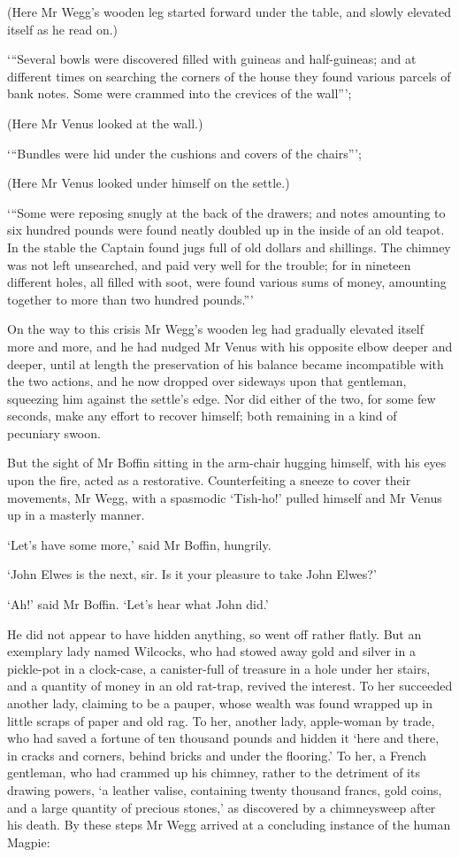 (Here Mr Wegg’s wooden leg started forward under the table, and slowly
elevated itself as he read on.)

‘“Several bowls were discovered filled with guineas and half-guineas;
and at different times on searching the corners of the house they found
various parcels of bank notes. Some were crammed into the crevices of
the wall”’;

(Here Mr Venus looked at the wall.)

‘“Bundles were hid under the cushions and covers of the chairs”’;

(Here Mr Venus looked under himself on the settle.)

‘“Some were reposing snugly at the back of the drawers; and notes
amounting to six hundred pounds were found neatly doubled up in the
inside of an old teapot. In the stable the Captain found jugs full of
old dollars and shillings. The chimney was not left unsearched, and paid
very well for the trouble; for in nineteen different holes, all filled
with soot, were found various sums of money, amounting together to more
than two hundred pounds.”’

On the way to this crisis Mr Wegg’s wooden leg had gradually elevated
itself more and more, and he had nudged Mr Venus with his opposite
elbow deeper and deeper, until at length the preservation of his balance
became incompatible with the two actions, and he now dropped over
sideways upon that gentleman, squeezing him against the settle’s edge.
Nor did either of the two, for some few seconds, make any effort to
recover himself; both remaining in a kind of pecuniary swoon.

But the sight of Mr Boffin sitting in the arm-chair hugging himself,
with his eyes upon the fire, acted as a restorative. Counterfeiting a
sneeze to cover their movements, Mr Wegg, with a spasmodic ‘Tish-ho!’
pulled himself and Mr Venus up in a masterly manner.

‘Let’s have some more,’ said Mr Boffin, hungrily.

‘John Elwes is the next, sir. Is it your pleasure to take John Elwes?’

‘Ah!’ said Mr Boffin. ‘Let’s hear what John did.’

He did not appear to have hidden anything, so went off rather flatly.
But an exemplary lady named Wilcocks, who had stowed away gold and
silver in a pickle-pot in a clock-case, a canister-full of treasure in
a hole under her stairs, and a quantity of money in an old rat-trap,
revived the interest. To her succeeded another lady, claiming to be a
pauper, whose wealth was found wrapped up in little scraps of paper and
old rag. To her, another lady, apple-woman by trade, who had saved a
fortune of ten thousand pounds and hidden it ‘here and there, in cracks
and corners, behind bricks and under the flooring.’ To her, a French
gentleman, who had crammed up his chimney, rather to the detriment
of its drawing powers, ‘a leather valise, containing twenty thousand
francs, gold coins, and a large quantity of precious stones,’ as
discovered by a chimneysweep after his death. By these steps Mr Wegg
arrived at a concluding instance of the human Magpie:


